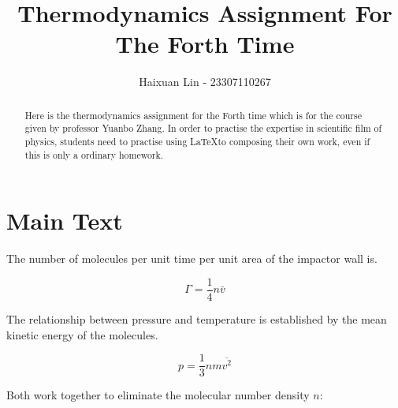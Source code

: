\documentclass[a4paper,11pt]{amsart}
\title{Thermodynamics Assignment For The Forth Time}
\author{Haixuan Lin - 23307110267}
\theoremstyle{definition}
\begin{document}
	
	\begin{abstract}
		Here is the thermodynamics assignment for the Forth time which is for the course given by professor Yuanbo Zhang. In order to practise the expertise in scientific film of physics, students need to practise using \LaTeX to composing their own work, even if this is only a ordinary homework.
	\end{abstract}
	
	\maketitle
	
	\section*{Main Text}

	The number of molecules per unit time per unit area of the impactor wall is.

	$$
	\varGamma =\frac{1}{4}n\bar{v}
	$$
	
	The relationship between pressure and temperature is established by the mean kinetic energy of the molecules.

	$$
	p=\frac{1}{3}nm\overline{v^2}
	$$

	Both work together to eliminate the molecular number density $n$:

	$$

	$$

	
\end{document}
